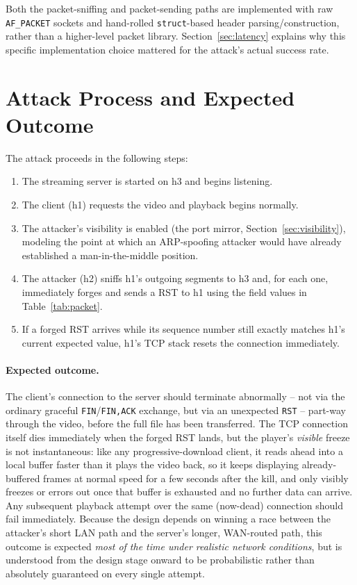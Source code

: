 \documentclass[11pt]{article}
\begin{document}
Both the packet-sniffing and packet-sending paths are implemented with
raw \texttt{AF\_PACKET} sockets and hand-rolled \texttt{struct}-based
header parsing/construction, rather than a higher-level packet library.
Section~\ref{sec:latency} explains why this specific implementation
choice mattered for the attack's actual success rate.

\section{Attack Process and Expected Outcome}
\label{sec:process}

The attack proceeds in the following steps:

\begin{enumerate}
  \item The streaming server is started on h3 and begins listening.
  \item The client (h1) requests the video and playback begins normally.
  \item The attacker's visibility is enabled (the port mirror,
    Section~\ref{sec:visibility}), modeling the point at which an
    ARP-spoofing attacker would have already established a
    man-in-the-middle position.
  \item The attacker (h2) sniffs h1's outgoing segments to h3 and, for
    each one, immediately forges and sends a RST to h1 using the field
    values in Table~\ref{tab:packet}.
  \item If a forged RST arrives while its sequence number still exactly
    matches h1's current expected value, h1's TCP stack resets the
    connection immediately.
\end{enumerate}

\paragraph{Expected outcome.} The client's connection to the server
should terminate abnormally -- not via the ordinary graceful
\texttt{FIN}/\texttt{FIN,ACK} exchange, but via an unexpected
\texttt{RST} -- part-way through the video, before the full file has
been transferred. The TCP connection itself dies immediately when the
forged RST lands, but the player's \emph{visible} freeze is not
instantaneous: like any progressive-download client, it reads ahead into
a local buffer faster than it plays the video back, so it keeps
displaying already-buffered frames at normal speed for a few seconds
after the kill, and only visibly freezes or errors out once that buffer
is exhausted and no further data can arrive. Any subsequent playback
attempt over the same (now-dead) connection should fail immediately.
Because the design depends on winning a race
between the attacker's short LAN path and the server's longer,
WAN-routed path, this outcome is expected \emph{most of the time under
realistic network conditions}, but is understood from the design stage
onward to be probabilistic rather than absolutely guaranteed on every
single attempt.
\end{document}
